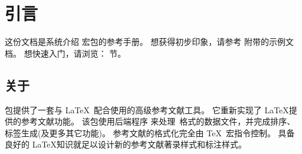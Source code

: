 

\section{引言}
\label{int}


这份文档是系统介绍 \biblatex 宏包的参考手册。
想获得初步印象，请参考 \biblatex 附带的示例文档。
想快速入门，请浏览： 节。



\subsection{关于 \biblatex}
\label{int:abt}

\biblatex 包提供了一套与 \LaTeX\ 配合使用的高级参考文献工具。
它重新实现了 \LaTeX 提供的参考文献功能。
该包使用后端程序 \biber 来处理\BibTeX\ 格式的数据文件，并完成排序、标签生成(及更多其它功能)。
参考文献的格式化完全由 \TeX\ 宏指令控制。
具备良好的 \LaTeX 知识就足以设计新的参考文献著录样式和标注样式。

